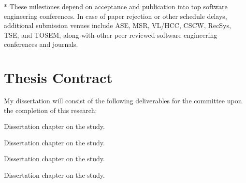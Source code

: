 * These milestones depend on acceptance and publication into top software engineering conferences. In case of paper rejection or other schedule delays, additional submission venues include ASE, MSR, VL/HCC, CSCW, RecSys, TSE, and TOSEM, along with other peer-reviewed software engineering conferences and journals.

\section{Thesis Contract}

My dissertation will consist of the following deliverables for the committee upon the completion of this research:

\begin{todolist}
  \item Dissertation chapter on the \peer study.
  \item Dissertation chapter on the \sorry study.
  \item Dissertation chapter on the \sugg study.
  \item Dissertation chapter on the \proc study.
\end{todolist}
